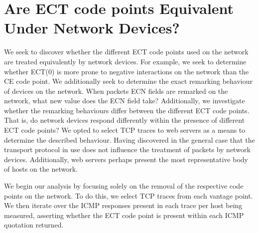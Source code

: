 \documentclass{l4proj}
\begin{document}
\section{Are ECT code points Equivalent Under Network Devices?}
\label{sec:ectcode points}

We seek to discover whether the different ECT code points used on the network are treated equivalently by network devices. For example, we seek to determine whether ECT(0) is more prone to negative interactions on the network than the CE code point. We additionally seek to determine the exact remarking behaviour of devices on the network. When packets ECN fields are remarked on the network, what new value does the ECN field take? Additionally, we investigate whether the remarking behaviours differ between the different ECT code points. That is, do network devices respond differently within the presence of different ECT code points? We opted to select TCP traces to web servers as a means to determine the described behaviour. Having discovered in the general case that the transport protocol in use does not influence the treatment of packets by network devices. Additionally, web servers perhaps present the most representative body of hosts on the network.

We begin our analysis by focusing solely on the removal of the respective code points on the network. To do this, we select TCP traces from each vantage point. We then iterate over the ICMP responses present in each trace per host being measured, asserting whether the ECT code point is present within each ICMP quotation returned.
\end{document}

